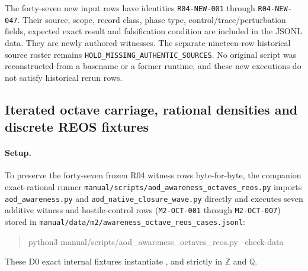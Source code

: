 The forty-seven new input rows have identities \texttt{R04-NEW-001} through
\texttt{R04-NEW-047}. Their source, scope, record class, phase type,
control/trace/perturbation fields, expected exact result and falsification
condition are included in the JSONL data. They are newly authored witnesses.
The separate nineteen-row historical source roster remains
\texttt{HOLD\_MISSING\_AUTHENTIC\_SOURCES}. No original script was reconstructed
from a basename or a former runtime, and these new executions do not satisfy
historical rerun rows.

\subsection{Iterated octave carriage, rational densities and discrete REOS fixtures}
\label{sec:m2-octaves-reos}
\paragraph{Setup.}
To preserve the forty-seven frozen R04 witness rows byte-for-byte, the companion
exact-rational runner \texttt{manual/scripts/aod\_awareness\_octaves\_reos.py}
imports \texttt{aod\_awareness.py} and \texttt{aod\_native\_closure\_wave.py}
directly and executes seven additive witness and hostile-control rows
(\texttt{M2-OCT-001} through \texttt{M2-OCT-007}) stored in
\texttt{manual/data/m2/awareness\_octave\_reos\_cases.jsonl}:
\begin{quote}\small\ttfamily
python3 manual/scripts/aod\_awareness\_octaves\_reos.py --check-data
\end{quote}
These D0 exact internal fixtures instantiate
,
 and
 strictly in \(\mathbb Z\) and
\(\mathbb Q\).

